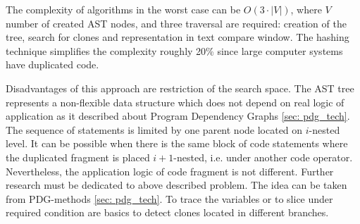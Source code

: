 \documentclass{report}
\begin{document}
The complexity of algorithms in the worst case can be $O(3\cdot|V|)$, where $V$ number of created AST nodes, and three traversal are required: creation of the tree, search for clones and representation in text compare window. The hashing technique simplifies the complexity roughly 20\% since large computer systems have duplicated code.

Disadvantages of this approach are restriction of the search space. The AST tree represents a non-flexible data structure which does not depend on real logic of application as it described about Program Dependency Graphs \ref{sec: pdg_tech}. The sequence of statements is limited by one parent node located on $i$-nested level. It can be possible when there is the same block of code statements where the duplicated fragment is placed $i+1$-nested, i.e. under another code operator. Nevertheless, the application logic  of code fragment is not different. Further research must be dedicated to above described problem. The idea can be taken from PDG-methods \ref{sec: pdg_tech}. To trace the variables or to slice under required condition are basics to detect clones located in different branches.
\end{document}
